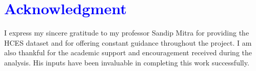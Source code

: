 \hspace{3 mm}
\section*{\textcolor{blue}{Acknowledgment}}
I express my sincere gratitude to my professor Sandip Mitra for providing the HCES dataset and for offering constant guidance throughout the project. I am also thankful for the academic support and encouragement received during the analysis. His inputs have been invaluable in completing this work successfully.
